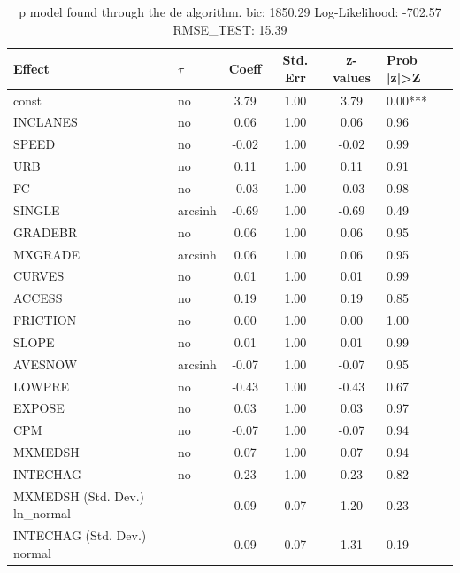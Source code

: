 \begin{table}
	\caption{p model found through the de algorithm. bic: 1850.29 Log-Likelihood: -702.57 RMSE_TEST: 15.39}
	\begin{center}
		\begin{tabular}{|l|l|c|c|c|l|}
			\hline
			Effect & $\tau$ & Coeff & Std. Err & z-values & Prob |z|>Z \\
			\hline
			const & no & 3.79 & 1.00 & 3.79 & 0.00*** \\
			\hline
			INCLANES & no & 0.06 & 1.00 & 0.06 & 0.96 \\
			\hline
			SPEED & no & -0.02 & 1.00 & -0.02 & 0.99 \\
			\hline
			URB & no & 0.11 & 1.00 & 0.11 & 0.91 \\
			\hline
			FC & no & -0.03 & 1.00 & -0.03 & 0.98 \\
			\hline
			SINGLE & arcsinh & -0.69 & 1.00 & -0.69 & 0.49 \\
			\hline
			GRADEBR & no & 0.06 & 1.00 & 0.06 & 0.95 \\
			\hline
			MXGRADE & arcsinh & 0.06 & 1.00 & 0.06 & 0.95 \\
			\hline
			CURVES & no & 0.01 & 1.00 & 0.01 & 0.99 \\
			\hline
			ACCESS & no & 0.19 & 1.00 & 0.19 & 0.85 \\
			\hline
			FRICTION & no & 0.00 & 1.00 & 0.00 & 1.00 \\
			\hline
			SLOPE & no & 0.01 & 1.00 & 0.01 & 0.99 \\
			\hline
			AVESNOW & arcsinh & -0.07 & 1.00 & -0.07 & 0.95 \\
			\hline
			LOWPRE & no & -0.43 & 1.00 & -0.43 & 0.67 \\
			\hline
			EXPOSE & no & 0.03 & 1.00 & 0.03 & 0.97 \\
			\hline
			CPM & no & -0.07 & 1.00 & -0.07 & 0.94 \\
			\hline
			MXMEDSH & no & 0.07 & 1.00 & 0.07 & 0.94 \\
			\hline
			INTECHAG & no & 0.23 & 1.00 & 0.23 & 0.82 \\
			\hline
			MXMEDSH (Std. Dev.) ln_normal &  & 0.09 & 0.07 & 1.20 & 0.23 \\
			\hline
			INTECHAG (Std. Dev.) normal &  & 0.09 & 0.07 & 1.31 & 0.19 \\
			\hline
		\end{tabular}
	\end{center}
\end{table}